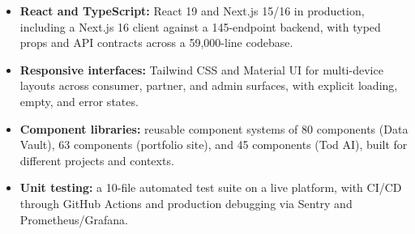 \documentclass[]{cover}
\begin{document}


\currentdate{\today}



{\raggedright{}\fontsize{11pt}{13pt}\selectfont
\renewcommand{\labelitemi}{\textbullet}
\renewcommand{\labelitemii}{\textbullet}
\renewcommand{\labelitemiii}{\textbullet}
\begin{itemize}
    \item {\textbf{React and TypeScript:} React 19 and Next.js 15/16 in production, including a Next.js 16 client against a 145-endpoint backend, with typed props and API contracts across a 59,000-line codebase.}
    \item {\textbf{Responsive interfaces:} Tailwind CSS and Material UI for multi-device layouts across consumer, partner, and admin surfaces, with explicit loading, empty, and error states.}
    \item {\textbf{Component libraries:} reusable component systems of 80 components (Data Vault), 63 components (portfolio site), and 45 components (Tod AI), built for different projects and contexts.}
    \item {\textbf{Unit testing:} a 10-file automated test suite on a live platform, with CI/CD through GitHub Actions and production debugging via Sentry and Prometheus/Grafana.}
\end{itemize}\par}
\vspace{6pt}
\end{document}
